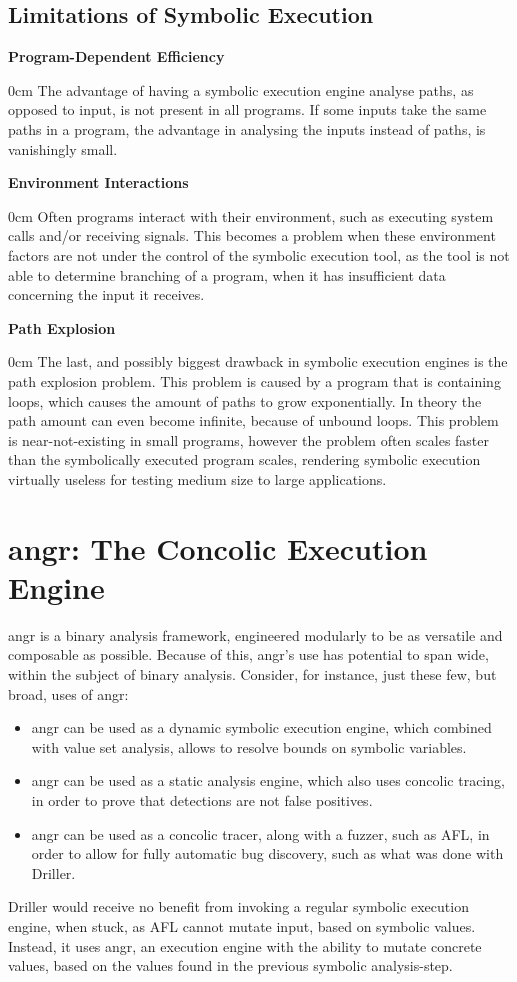 \documentclass[a4paper]{article}
\newcommand{\tbf}[1]{\textbf{#1}}
\newcommand{\marginwidth}{0.5cm}
\newcommand{\subsubsubsection}[1]{\tbf{#1}\begin{addmargin}[\marginwidth]{0cm}}
\begin{document}
\subsection{Limitations of Symbolic Execution}
\label{sec:LimitsSymEx}
\subsubsubsection{Program-Dependent Efficiency}
The advantage of having a symbolic execution engine analyse paths, as opposed to input, is not present in all programs. If some inputs take the same paths in a program, the advantage in analysing the inputs instead of paths, is vanishingly small.
\end{addmargin}
\subsubsubsection{Environment Interactions}
Often programs interact with their environment, such as executing system calls and/or receiving signals. This becomes a problem when these environment factors are not under the control of the symbolic execution tool, as the tool is not able to determine branching of a program, when it has insufficient data concerning the input it receives.
\end{addmargin}
\subsubsubsection{Path Explosion}
The last, and possibly biggest drawback in symbolic execution engines is the path explosion problem. This problem is caused by a program that is containing loops, which causes the amount of paths to grow exponentially. In theory the path amount can even become infinite, because of unbound loops. This problem is near-not-existing in small programs, however the problem often scales faster than the symbolically executed program scales, rendering symbolic execution virtually useless for testing medium size to large applications.
\end{addmargin}
\newpage
\section{angr: The Concolic Execution Engine}
\label{sec:angr}
angr is a binary analysis framework, engineered modularly to be as versatile and composable as possible. Because of this, angr's use has potential to span wide, within the subject of binary analysis. Consider, for instance, just these few, but broad, uses of angr:
\begin{itemize}
	\item angr can be used as a dynamic symbolic execution engine, which combined with value set analysis, allows to resolve bounds on symbolic variables.
	\item angr can be used as a static analysis engine, which also uses concolic tracing, in order to prove that detections are not false positives.
	\item angr can be used as a concolic tracer, along with a fuzzer, such as AFL, in order to allow for fully automatic bug discovery, such as what was done with Driller.
\end{itemize}
Driller would receive no benefit from invoking a regular symbolic execution engine, when stuck, as AFL cannot mutate input, based on symbolic values. Instead, it uses angr, an execution engine with the ability to mutate concrete values, based on the values found in the previous symbolic analysis-step.
\end{document}
